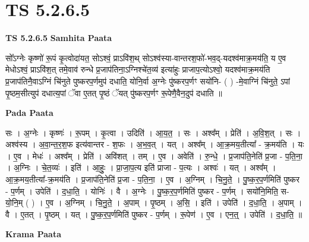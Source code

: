 \documentclass[17pt]{extarticle}
\begin{document}
\section{ TS 5.2.6.5 }

\textbf{TS 5.2.6.5 } \newline
\textbf{Samhita Paata} \newline

सो᳚ऽग्नेः कृष्णो॑ रू॒पं कृ॒त्वोदा॑यत॒ सोऽश्वं॒ प्राऽवि॑श॒थ् सोऽश्व॑स्या-वान्तरश॒फो॑-भव॒द्-यदश्व॑माक्र॒मय॑ति॒ य ए॒व मेधोऽश्वं॒ प्राऽवि॑श॒त् तमे॒वाव॑ रुन्धे प्र॒जाप॑तिना॒ऽग्निश्चे॑त॒व्य॑ इत्या॑हुः प्राजाप॒त्योऽश्वो॒ यदश्व॑माक्र॒मय॑ति प्र॒जाप॑तिनै॒वाऽग्निं चि॑नुते पुष्करप॒र्णमुप॑ दधाति॒ योनि॒र्वा अ॒ग्नेः पु॑ष्करप॒र्णꣳ सयो॑नि- ( ) -मे॒वाग्निं चि॑नुते॒ ऽपां पृ॒ष्ठम॒सीत्युप॑ दधात्य॒पां ॅवा ए॒तत् पृ॒ष्ठं ॅयत् पु॑ष्करप॒र्णꣳ रू॒पेणै॒वैन॒दुप॑ दधाति ॥ \newline

\textbf{Pada Paata} \newline

सः । अ॒ग्नेः । कृष्णः॑ । रू॒पम् । कृ॒त्वा । उदिति॑ । आ॒य॒त॒ । सः । अश्व᳚म् । प्रेति॑ । अ॒वि॒श॒त् । सः । अश्व॑स्य । अ॒वा॒न्त॒र॒श॒फ इत्य॑वान्तर - श॒फः । अ॒भ॒व॒त् । यत् । अश्व᳚म् । आ॒क्र॒मय॒तीत्या᳚ - क्र॒मय॑ति । यः । ए॒व । मेधः॑ । अश्व᳚म् । प्रेति॑ । अवि॑शत् । तम् । ए॒व । अवेति॑ । रु॒न्धे॒ । प्र॒जाप॑ति॒नेति॑ प्र॒जा - प॒ति॒ना॒ । अ॒ग्निः । चे॒त॒व्यः॑ । इति॑ । आ॒हुः॒ । प्रा॒जा॒प॒त्य इति॑ प्राजा - प॒त्यः । अश्वः॑ । यत् । अश्व᳚म् । आ॒क्र॒मय॒तीत्या᳚-क्र॒मय॑ति । प्र॒जाप॑ति॒नेति॑ प्र॒जा - प॒ति॒ना॒ । ए॒व । अ॒ग्निम् । चि॒नु॒ते॒ । पु॒ष्क॒र॒प॒र्णमिति॑ पुष्कर - प॒र्णम् । उपेति॑ । द॒धा॒ति॒ । योनिः॑ । वै । अ॒ग्नेः । पु॒ष्क॒र॒प॒र्णमिति॑ पुष्कर - प॒र्णम् । सयो॑नि॒मिति॒ स-यो॒नि॒म् ( ) । ए॒व । अ॒ग्निम् । चि॒नु॒ते॒ । अ॒पाम् । पृ॒ष्ठम् । अ॒सि॒ । इति॑ । उपेति॑ । द॒धा॒ति॒ । अ॒पाम् । वै । ए॒तत् । पृ॒ष्ठम् । यत् । पु॒ष्क॒र॒प॒र्णमिति॑ पुष्कर - प॒र्णम् । रू॒पेण॑ । ए॒व । एन॒त्॒ । उपेति॑ । द॒धा॒ति॒ ॥  \newline


\textbf{Krama Paata} \newline
\end{document}

